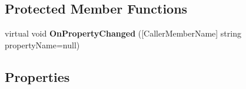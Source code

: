 \subsection*{Protected Member Functions}
\begin{DoxyCompactItemize}
\item 
\hypertarget{class__1aarsproeve_1_1_model_1_1_vagtplan_singleton_a6c48f9609490768fd5a312e5a7d3f21f}{}virtual void {\bfseries On\+Property\+Changed} (\mbox{[}Caller\+Member\+Name\mbox{]} string property\+Name=null)\label{class__1aarsproeve_1_1_model_1_1_vagtplan_singleton_a6c48f9609490768fd5a312e5a7d3f21f}

\end{DoxyCompactItemize}
\subsection*{Properties}
